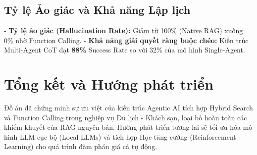 \documentclass[12pt,a4paper]{report}
\begin{document}
\section{Tỷ lệ Ảo giác và Khả năng Lập lịch}
- \textbf{Tỷ lệ ảo giác (Hallucination Rate):} Giảm từ 100\% (Native RAG) xuống 0\% nhờ Function Calling.
- \textbf{Khả năng giải quyết ràng buộc chéo:} Kiến trúc Multi-Agent CoT đạt \textbf{88\%} Success Rate so với 32\% của mô hình Single-Agent.

\chapter{Tổng kết và Hướng phát triển}
Đồ án đã chứng minh sự ưu việt của kiến trúc Agentic AI tích hợp Hybrid Search và Function Calling trong nghiệp vụ Du lịch - Khách sạn, loại bỏ hoàn toàn các khiếm khuyết của RAG nguyên bản. Hướng phát triển tương lai sẽ tối ưu hóa mô hình LLM cục bộ (Local LLMs) và tích hợp Học tăng cường (Reinforcement Learning) cho quá trình đàm phán giá cả tự động.
\end{document}
